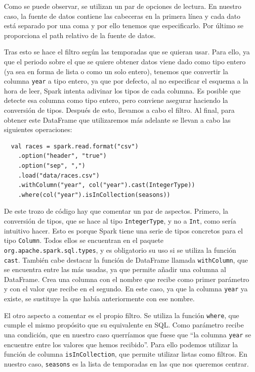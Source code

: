 \documentclass[12pt,twoside,titlepage]{report}
\newcommand{\quotes}[1]{``#1''}
\begin{document}
Como se puede observar, se utilizan un par de opciones de lectura. En nuestro caso, la fuente de datos contiene las cabeceras en la primera línea y cada dato está separado por una coma y por ello tenemos que especificarlo. Por último se proporciona el path relativo de la fuente de datos.

Tras esto se hace el filtro según las temporadas que se quieran usar. Para ello, ya que el periodo sobre el que se quiere obtener datos viene dado como tipo entero (ya sea en forma de lista o como un solo entero), tenemos que convertir la columna \texttt{year} a tipo entero, ya que por defecto, al no especificar el esquema a la hora de leer, Spark intenta adivinar los tipos de cada columna. Es posible que detecte esa columna como tipo entero, pero conviene asegurar haciendo la conversión de tipos. Después de esto, llevamos a cabo el filtro. Al final, para obtener este DataFrame que utilizaremos más adelante se llevan a cabo las siguientes operaciones:

\begin{lstlisting}
  val races = spark.read.format("csv")
    .option("header", "true")
    .option("sep", ",")
    .load("data/races.csv")
    .withColumn("year", col("year").cast(IntegerType))
    .where(col("year").isInCollection(seasons))
\end{lstlisting}

De este trozo de código hay que comentar un par de aspectos. Primero, la conversión de tipos, que se hace al tipo \texttt{IntegerType}, y no a \texttt{Int}, como sería intuitivo hacer. Esto es porque Spark tiene una serie de tipos concretos para el tipo \texttt{Column}. Todos ellos se encuentran en el paquete \texttt{org.apache.spark.sql.types}, y es obligatorio su uso si se utiliza la función \texttt{cast}. También cabe destacar la función de DataFrame llamada \texttt{withColumn}, que se encuentra entre las más usadas, ya que permite añadir una columna al DataFrame. Crea una columna con el nombre que recibe como primer parámetro y con el valor que recibe en el segundo. En este caso, ya que la columna \texttt{year} ya existe, se sustituye la que había anteriormente con ese nombre.

El otro aspecto a comentar es el propio filtro. Se utiliza la función \texttt{where}, que cumple el mismo propósito que su equivalente en SQL. Como parámetro recibe una condición, que en nuestro caso querríamos que fuese que \quotes{la columna \texttt{year} se encuentre entre los valores que hemos recibido}. Para ello podemos utilizar la función de columna \texttt{isInCollection}, que permite utilizar listas como filtros. En nuestro caso, \texttt{seasons} es la lista de temporadas en las que nos queremos centrar.
\end{document}
